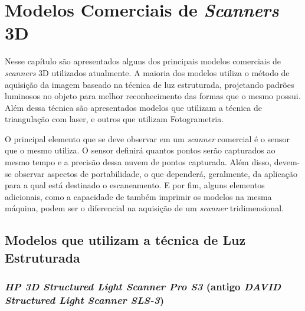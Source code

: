 \chapter{Modelos Comerciais de \textit{Scanners} 3D} %
\thispagestyle{empty}

Nesse capítulo são apresentados alguns dos principais modelos comerciais de \textit{scanners} 3D utilizados atualmente. A maioria dos modelos utiliza o método de aquisição da imagem baseado na técnica de luz estruturada, projetando padrões luminosos no objeto para melhor reconhecimento das formas que o mesmo possui. Além dessa técnica são apresentados modelos que utilizam a técnica de triangulação com laser, e outros que utilizam Fotogrametria.

O principal elemento que se deve observar em um \textit{scanner} comercial é o sensor que o mesmo utiliza. O sensor definirá quantos pontos serão capturados ao mesmo tempo e a precisão dessa nuvem de pontos capturada. Além disso, devem-se observar aspectos de portabilidade, o que dependerá, geralmente, da aplicação para a qual está destinado o escaneamento. E por fim, alguns elementos adicionais, como a capacidade de também imprimir os modelos na mesma máquina, podem ser o diferencial na aquisição de um \textit{scanner} tridimensional.

\section{Modelos que utilizam a técnica de Luz Estruturada}

\subsection{\textit{HP 3D Structured Light Scanner Pro S3} (antigo \textit{DAVID Structured Light Scanner SLS-3})}
